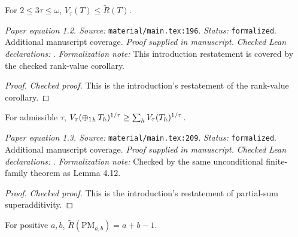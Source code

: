 \renewcommand{\thetheorem}{1.2}
\begin{equationresult}
\label{eq:schonhages-ineq}
\manuscriptproof
{}
\leanok
For $2\le3\tau\le\omega$, $V_\tau(T)\le\widetilde R(T)$.
\end{equationresult}

\noindent\textit{Paper equation 1.2. Source:} \texttt{material/main.tex:196}.
\textit{Status:} \texttt{formalized}. Additional manuscript coverage.
\textit{Proof supplied in manuscript.}
\textit{Checked Lean declarations:} .
\textit{Formalization note:} This introduction restatement is covered by the checked rank-value corollary.

\begin{proof}
\leanok
{}
\textit{Checked proof.} This is the introduction's restatement of the rank-value corollary.
\end{proof}

\renewcommand{\thetheorem}{1.3}
\begin{equationresult}
\label{eq:partial-direct-sum-ineq}
\manuscriptproof
{}
\leanok
For admissible $\tau$, $V_\tau(\mathop{\mathbin{\oplus_1}}_hT_h)^{1/\tau}\ge\sum_hV_\tau(T_h)^{1/\tau}$.
\end{equationresult}

\noindent\textit{Paper equation 1.3. Source:} \texttt{material/main.tex:209}.
\textit{Status:} \texttt{formalized}. Additional manuscript coverage.
\textit{Proof supplied in manuscript.}
\textit{Checked Lean declarations:} .
\textit{Formalization note:} Checked by the same unconditional finite-family theorem as Lemma 4.12.

\begin{proof}
\leanok
{}
\textit{Checked proof.} This is the introduction's restatement of partial-sum superadditivity.
\end{proof}

\renewcommand{\thetheorem}{1.4}
\begin{equationresult}
\label{eq:a-rk-pm}
\manuscriptproof
{}
\leanok
For positive $a,b$, $\widetilde R(\mathrm{PM}_{a,b})=a+b-1$.
\end{equationresult}

